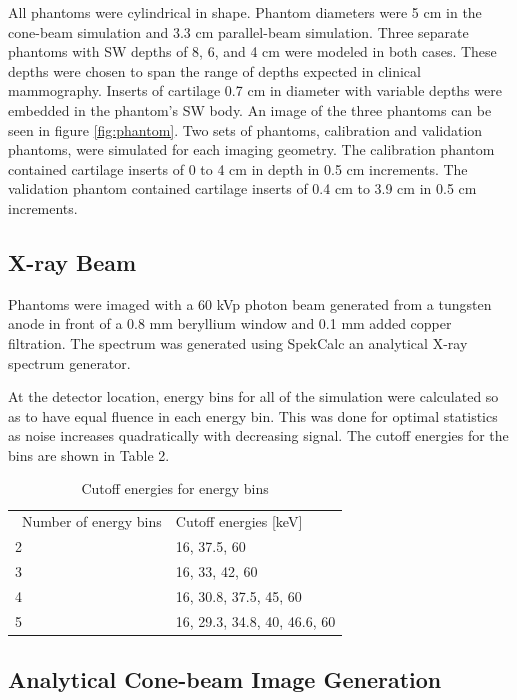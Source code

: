 \documentclass[a4paper,11pt]{article}
\begin{document}
All phantoms were cylindrical in shape. Phantom diameters were 5 cm in the cone-beam simulation and 3.3 cm parallel-beam simulation. Three separate phantoms with SW depths of 8,  6, and 4 cm were modeled in both cases. These depths were chosen to span the range of depths expected in clinical mammography. Inserts of cartilage 0.7 cm in diameter with variable depths were embedded in the phantom's SW body. An image of the three phantoms can be seen in figure \ref{fig:phantom}. Two sets of phantoms, calibration and validation phantoms, were simulated for each imaging geometry.  The calibration phantom contained cartilage inserts of 0 to 4 cm in depth in 0.5 cm increments. The validation phantom contained cartilage inserts of 0.4 cm to 3.9 cm in 0.5 cm increments.

\subsection{X-ray Beam}

Phantoms were imaged with a 60 kVp photon beam generated from a tungsten anode in front of a 0.8 mm beryllium window and 0.1 mm added copper filtration. The spectrum was generated using SpekCalc \cite{Poludniowski2009SpekCalc:Tubes} an analytical X-ray spectrum generator. 

At the detector location, energy bins for all of the simulation were calculated so as to have equal fluence in each energy bin. This was done for optimal statistics as noise increases quadratically with decreasing signal. The cutoff energies for the bins are shown in Table 2.

\begin{table}[]
\label{energies}
\caption{Cutoff energies for energy bins}
\begin{tabular}{ll}
\ Number of energy bins & Cutoff energies {[}keV{]}     \\
2              & 16, 37.5, 60                 \\
3              & 16, 33, 42, 60               \\
4              & 16, 30.8, 37.5, 45, 60       \\
5              & 16, 29.3, 34.8, 40, 46.6, 60
\end{tabular}
\end{table}

\subsection{Analytical Cone-beam Image Generation}
\end{document}
